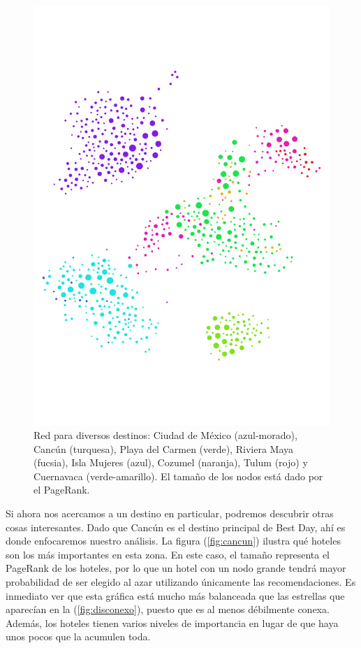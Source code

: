 \documentclass[12pt]{report}
\begin{document}
\begin{figure}[ht]
	\centering
	\includegraphics[width=\textwidth,
		trim = 0 300 0 300, clip]{imagenes/destinos2.png}
	\caption{\label{fig:destinos} Red para diversos destinos: Ciudad de México (azul-morado), Cancún (turquesa), Playa del Carmen (verde), Riviera Maya (fucsia), Isla Mujeres (azul), Cozumel (naranja), Tulum (rojo) y Cuernavaca (verde-amarillo). El tamaño de los nodos está dado por el PageRank.}
\end{figure}

Si ahora nos acercamos a un destino en particular, podremos descubrir otras cosas interesantes. Dado que Cancún es el destino principal de Best Day, ahí es donde enfocaremos nuestro análisis. La figura (\ref{fig:cancun}) ilustra qué hoteles son los más importantes en esta zona. En este caso, el tamaño representa el PageRank de los hoteles, por lo que un hotel con un nodo grande tendrá mayor probabilidad de ser elegido al azar utilizando únicamente las recomendaciones. Es inmediato ver que esta gráfica está mucho más balanceada que las estrellas que aparecían en la (\ref{fig:disconexo}), puesto que es al menos débilmente conexa. Además, los hoteles tienen varios niveles de importancia en lugar de que haya unos pocos que la acumulen toda.
\end{document}
